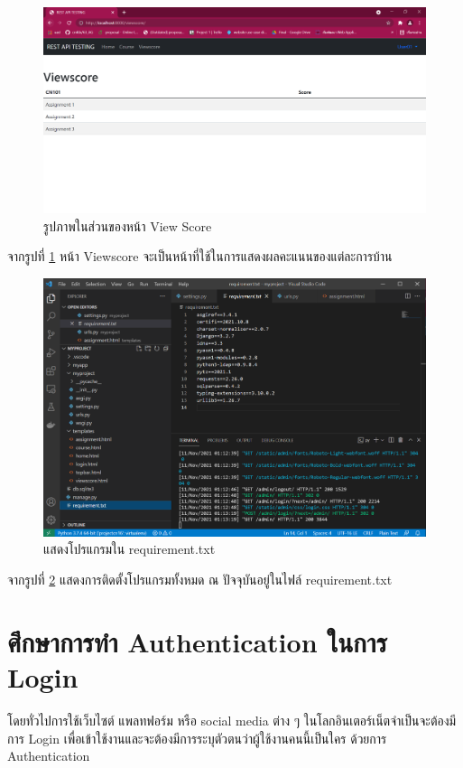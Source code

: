 \begin{figure}[!thb]
	\captionsetup{justification=centering}
	\centering
	\includegraphics[width=5in]{latex/figures/score.png}
	\caption{รูปภาพในส่วนของหน้า View Score}
	\label{fig:score}
\end{figure}
\noindent จากรูปที่ \ref{fig:score} หน้า Viewscore จะเป็นหน้าที่ใช้ในการแสดงผลคะแนนของแต่ละ\mbox{การบ้าน}
\begin{figure}[!thb]
	\captionsetup{justification=centering}
	\centering
	\includegraphics[width=5in]{latex/figures/code.png}
	\caption{แสดงโปรแกรมใน requirement.txt}
	\label{fig:code}
\end{figure}
\newline
จากรูปที่ \ref{fig:code} แสดงการติดตั้งโปรแกรมทั้งหมด ณ ปัจจุบันอยู่ในไฟล์ requirement.txt
\newpage

\section{ศึกษาการทำ Authentication ในการ Login }
โดยทั่วไปการใช้เว็บไซต์ แพลทฟอร์ม หรือ social media ต่าง ๆ ในโลกอินเตอร์เน็ต\mbox{จำเป็น}จะต้องมีการ Login เพื่อเข้าใช้งานและจะต้องมีการระบุตัวตนว่าผู้ใช้งานคนนี้เป็นใคร ด้วยการ Authentication

